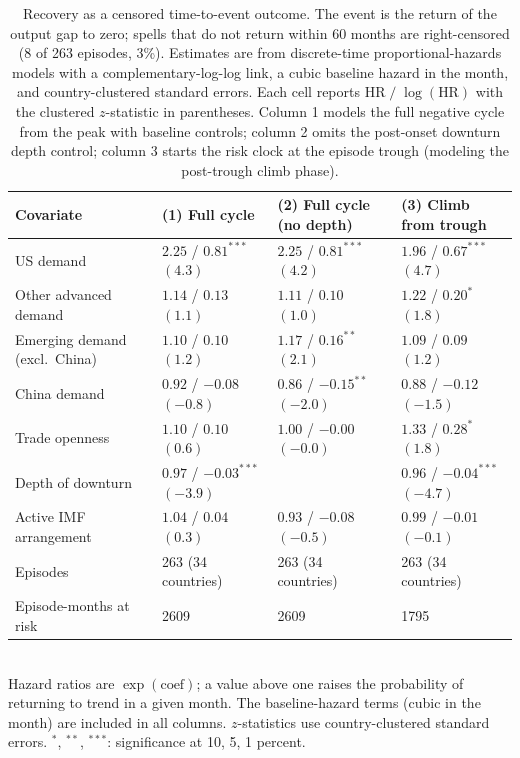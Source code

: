 \begin{table}[H]
\centering\small
\caption{Recovery as a censored time-to-event outcome. The event is the return of the output gap to zero; spells that do not return within 60 months are right-censored (8 of 263 episodes, 3\%). Estimates are from discrete-time proportional-hazards models with a complementary-log-log link, a cubic baseline hazard in the month, and country-clustered standard errors. Each cell reports $\text{HR} \;/\; \log(\text{HR})$ with the clustered $z$-statistic in parentheses. Column 1 models the full negative cycle from the peak with baseline controls; column 2 omits the post-onset downturn depth control; column 3 starts the risk clock at the episode trough (modeling the post-trough climb phase).}
\label{tab:survival}
\begin{tabularx}{\textwidth}{@{}lYYY@{}}
\toprule
Covariate & (1) Full cycle & (2) Full cycle (no depth) & (3) Climb from trough \\ \midrule
US demand & $2.25$ / $0.81^{***}$ {\scriptsize$(4.3)$} & $2.25$ / $0.81^{***}$ {\scriptsize$(4.2)$} & $1.96$ / $0.67^{***}$ {\scriptsize$(4.7)$} \\
Other advanced demand & $1.14$ / $0.13$ {\scriptsize$(1.1)$} & $1.11$ / $0.10$ {\scriptsize$(1.0)$} & $1.22$ / $0.20^{*}$ {\scriptsize$(1.8)$} \\
Emerging demand (excl.\ China) & $1.10$ / $0.10$ {\scriptsize$(1.2)$} & $1.17$ / $0.16^{**}$ {\scriptsize$(2.1)$} & $1.09$ / $0.09$ {\scriptsize$(1.2)$} \\
China demand & $0.92$ / $-0.08$ {\scriptsize$(-0.8)$} & $0.86$ / $-0.15^{**}$ {\scriptsize$(-2.0)$} & $0.88$ / $-0.12$ {\scriptsize$(-1.5)$} \\
Trade openness & $1.10$ / $0.10$ {\scriptsize$(0.6)$} & $1.00$ / $-0.00$ {\scriptsize$(-0.0)$} & $1.33$ / $0.28^{*}$ {\scriptsize$(1.8)$} \\
Depth of downturn & $0.97$ / $-0.03^{***}$ {\scriptsize$(-3.9)$} &  & $0.96$ / $-0.04^{***}$ {\scriptsize$(-4.7)$} \\
Active IMF arrangement & $1.04$ / $0.04$ {\scriptsize$(0.3)$} & $0.93$ / $-0.08$ {\scriptsize$(-0.5)$} & $0.99$ / $-0.01$ {\scriptsize$(-0.1)$} \\
\midrule
Episodes & 263 (34 countries) & 263 (34 countries) & 263 (34 countries) \\
Episode-months at risk & 2609 & 2609 & 1795 \\
\bottomrule
\end{tabularx}
\\[2pt]\footnotesize{Hazard ratios are $\exp(\text{coef})$; a value above one raises the probability of returning to trend in a given month. The baseline-hazard terms (cubic in the month) are included in all columns. $z$-statistics use country-clustered standard errors. $^{*}$, $^{**}$, $^{***}$: significance at 10, 5, 1 percent.}
\end{table}
